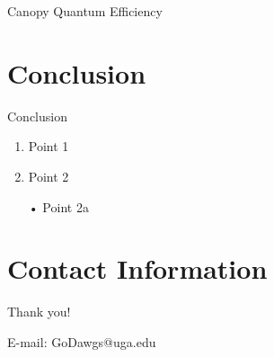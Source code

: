 \documentclass[10pt]{beamer}
\begin{document}
\begin{frame}{Canopy Quantum Efficiency}
    
\end{frame}
    



\section{Conclusion}
\begin{frame}{Conclusion}
\begin{enumerate}[(1)]
\item Point 1 
\vspace{3mm}
\vspace{3mm}
\item Point 2 
\vspace{3mm}
\vspace{3mm}

• Point 2a
\end{enumerate}
\end{frame}

\section{Contact Information}  
\begin{frame}

\textcolor{myNewColorC}{\huge{\centerline{Thank you!}}}
\vspace*{0.5cm}

\textcolor{myNewColorA}{\Large{\centerline{E-mail: GoDawgs@uga.edu}}}

\end{frame}
\end{document}
